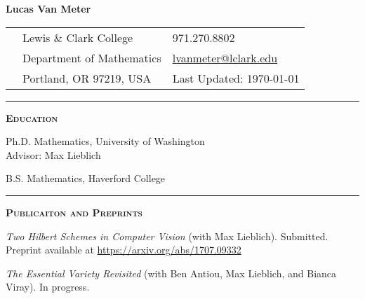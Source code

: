 \documentclass[12pt]{article}
\newcommand{\sectionheading}[1]
	{\bigskip %
	\noindent
	\hspace{-6.5mm}\textcolor{Gray}{\rule[.75mm]{21.5mm}{1mm}}
	\hspace{.2mm}	%
	{\large{\textbf{\textsc{#1}}}} %
}
\newenvironment{date_section}
	{
	\vspace{-1ex}
	\leftmargini = 15ex
	 \begin{itemize}[
		 labelsep = *,
		 labelwidth = 9ex,
		 labelindent = 0ex,
		 itemindent = !,
		 font=\normalfont, 
		 align=parleft
		 ]
		{}
		\itemsep=-1.5mm}
	{\end{itemize}\vspace{-2ex}}
\newcommand{\yearmo}[2]{
	\item[\hspace{-5.75ex} 
		{\makebox[.0005ex][r]{#1}}
		\hspace{1.15ex}
		{\makebox[.05ex][l]{#2} }
		] }
\newcommand{\yearsingle}[2]{
			\item[  
				{\makebox[.0005ex][r]{#1}}
				\hspace{2ex}
				{\makebox[.05ex][l]{#2} }
				] }
\newcommand{\yearexp}[1]{
	\item[ \hspace{1.79ex}
		{\makebox[1ex][c]{#1}}
		] }
\begin{document}

	\thispagestyle{empty}

	\centerline{{\LARGE \sc\textbf{Lucas Van Meter}}}

	\vspace{3mm}

	\begin{center}
	\setlength{\tabcolsep}{8pt}
		\begin{tabular}[c]{lll} %
			\phantom{aaaaaaaaa} 	%
			& Lewis \& Clark College \hspace{.4cm}
				& 971.270.8802\\
 			& Department of Mathematics
				& \url{lvanmeter@lclark.edu}\\
			& Portland, OR 97219, USA
				& Last Updated: \today 
		\end{tabular}
	\end{center}
	
		\sectionheading{Education}%
		
			\begin{date_section}
		
				\yearsingle{}{2019}%
				  Ph.D. Mathematics, University of Washington \\
				  Advisor: Max Lieblich
		
				\yearsingle{}{2012}%
				B.S. Mathematics, Haverford College
		
			\end{date_section}
			
		\sectionheading{Publicaiton and Preprints}%
\begin{date_section}
\yearexp{Jul. 2018}{}\emph{Two Hilbert Schemes in Computer Vision} (with Max Lieblich). Submitted. Preprint available at \url{https://arxiv.org/abs/1707.09332}

        
        
			\yearmo{}{}\emph{The Essential Variety Revisited} (with Ben Antiou, Max Lieblich, and Bianca Viray). In progress.
			\end{date_section}
        
\end{document}
